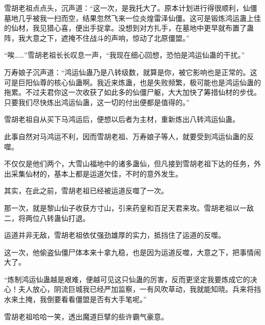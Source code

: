 \begin{this_body}
雪胡老祖点点头，沉声道：“这一次，是我托大了。原本计划进行得很顺利，仙僵墓地几乎被我一扫而空，结果忽然飞来一位炎煌雷泽仙僵。这可是锻炼鸿运蛊上佳的仙材，我见猎心喜，便出手捉拿。没想到对方扎手，在墓地中更早就布置了蛊阵，我大意之下，遮掩不住战斗的声响，惊动了北原僵盟。”

“唉……”雪胡老祖长长叹息一声，“我现在细心回想，恐怕是鸿运仙蛊的干扰。”

万寿娘子沉声道：“鸿运仙蛊乃是八转级数，就算是你，被它影响也是正常的。这可是巨阳仙尊的核心仙蛊啊。我近来炼蛊，也是失败频繁，极可能也是鸿运仙蛊的拖累。不过夫君你这一次收获了如此多的仙僵尸躯，大大加快了筹措仙材的步伐。只要我们尽快炼出鸿运仙蛊，这一切的付出便都是值得的。”

雪胡老祖自从买下马鸿运后，便想以后者为主材，重新炼出八转鸿运仙蛊。

此事自然对马鸿运不利，因而雪胡老祖、万寿娘子等人，就要受到鸿运仙蛊的反噬。

不仅仅是他们两个，大雪山福地中的诸多蛊仙，但凡接到雪胡老祖下达的任务，外出采集仙材的，基本上都是运道欠佳，不时的意外发生。

其实，在此之前，雪胡老祖已经被运道反噬了一次。

那一次，就是黎山仙子收获方寸山，引来药皇和百足天君来攻。雪胡老祖以一敌二，将两位八转蛊仙打退。

运道并非无敌，雪胡老祖依仗强劲雄厚的实力，抵挡住了运道的反噬。

这一次，他偷盗仙僵尸体本来十拿九稳，也是因为运道反噬，大意之下，把事情闹大了。

“炼制鸿运仙蛊越是艰难，便越可见这只仙蛊的厉害，反而更坚定我要炼成它的决心！夫人放心，阴流巨城我已经严加监察，一有风吹草动，我就能知晓。兵来将挡水来土掩，我倒要看看僵盟是否有大手笔呢。”

雪胡老祖哈哈一笑，透出魔道巨擘的些许霸气豪意。

\end{this_body}

